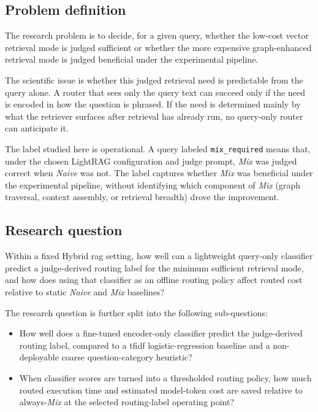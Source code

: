 \documentclass[english, bibtex]{kththesis}               %
\numberwithin{listing}{chapter}
\begin{document}
\subsection{Problem definition}
\label{sec:problemDefinition}

The research problem is to decide, for a given query, whether the low-cost vector retrieval mode is judged sufficient or whether the more expensive graph-enhanced retrieval mode is judged beneficial under the experimental pipeline.

The scientific issue is whether this judged retrieval need is predictable from the query alone. A router that sees only the query text can succeed only if the need is encoded in how the question is phrased. If the need is determined mainly by what the retriever surfaces after retrieval has already run, no query-only router can anticipate it.

The label studied here is operational. A query labeled \texttt{mix\_required} means that, under the chosen LightRAG configuration and judge prompt, \emph{Mix} was judged correct when \emph{Naive} was not. The label captures whether \emph{Mix} was beneficial under the experimental pipeline, without identifying which component of \emph{Mix} (graph traversal, context assembly, or retrieval breadth) drove the improvement.

\subsection{Research question}
\label{sec:researchQuestion}

Within a fixed Hybrid \gls{rag} setting, how well can a lightweight query-only classifier predict a judge-derived routing label for the minimum sufficient retrieval mode, and how does using that classifier as an offline routing policy affect routed cost relative to static \emph{Naive} and \emph{Mix} baselines?

The research question is further split into the following sub-questions:

\begin{itemize}
    \item How well does a fine-tuned encoder-only classifier predict the judge-derived routing label, compared to a \gls{tfidf} logistic-regression baseline and a non-deployable coarse question-category heuristic?
    \item When classifier scores are turned into a thresholded routing policy, how much routed execution time and estimated model-token cost are saved relative to always-\emph{Mix} at the selected routing-label operating point?
\end{itemize}
\end{document}
